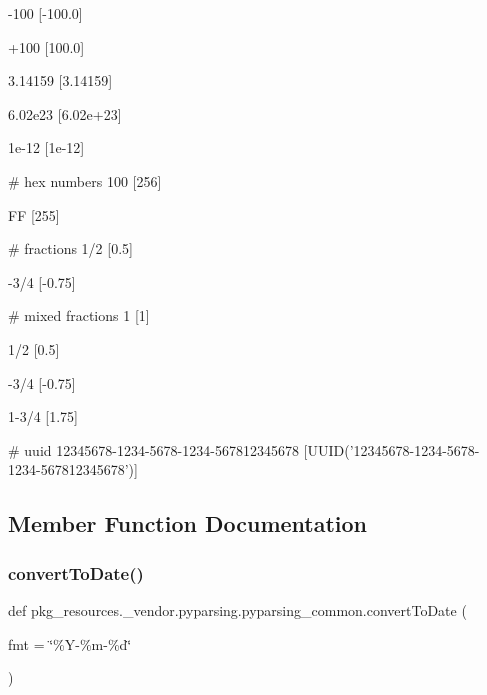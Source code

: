 \begin{DoxyVerb}
    -100
    [-100.0]

    +100
    [100.0]

    3.14159
    [3.14159]

    6.02e23
    [6.02e+23]

    1e-12
    [1e-12]

    # hex numbers
    100
    [256]

    FF
    [255]

    # fractions
    1/2
    [0.5]

    -3/4
    [-0.75]

    # mixed fractions
    1
    [1]

    1/2
    [0.5]

    -3/4
    [-0.75]

    1-3/4
    [1.75]

    # uuid
    12345678-1234-5678-1234-567812345678
    [UUID('12345678-1234-5678-1234-567812345678')]
\end{DoxyVerb}
 

\subsection{Member Function Documentation}
\mbox{\label{classpkg__resources_1_1__vendor_1_1pyparsing_1_1pyparsing__common_a467e847f52d14bf50acf1a88ca4e7cfa}} 
\subsubsection{\texorpdfstring{convert\+To\+Date()}{convertToDate()}}
{\footnotesize\ttfamily def pkg\+\_\+resources.\+\_\+vendor.\+pyparsing.\+pyparsing\+\_\+common.\+convert\+To\+Date (\begin{DoxyParamCaption}\item[{}]{fmt = {\ttfamily \char`\"{}\%Y-\/\%m-\/\%d\char`\"{}} }\end{DoxyParamCaption})\hspace{0.3cm}{\ttfamily [static]}}

